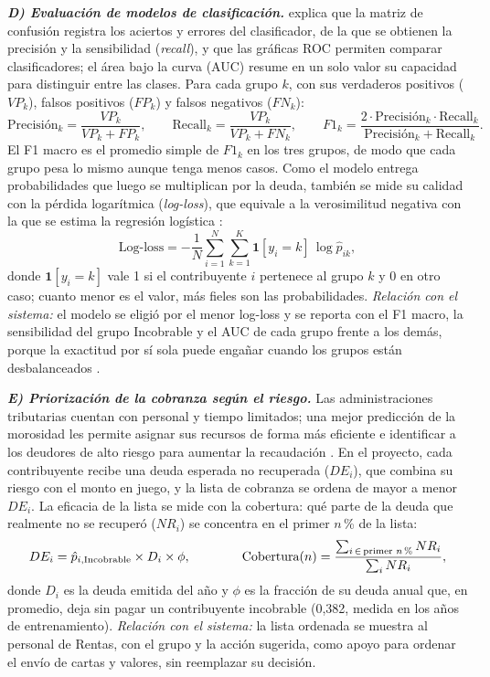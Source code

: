 \documentclass[12pt,a4paper]{report}
\begin{document}
\noindent\textbf{\textit{D) Evaluación de modelos de clasificación.}} \textcite{fawcett2006} explica que la matriz de confusión registra los aciertos y errores del clasificador, de la que se obtienen la precisión y la sensibilidad (\textit{recall}), y que las gráficas ROC permiten comparar clasificadores; el área bajo la curva (AUC) resume en un solo valor su capacidad para distinguir entre las clases. Para cada grupo $k$, con sus verdaderos positivos ($VP_k$), falsos positivos ($FP_k$) y falsos negativos ($FN_k$):
\begin{equation}
\text{Precisión}_k=\frac{VP_k}{VP_k+FP_k},\qquad
\text{Recall}_k=\frac{VP_k}{VP_k+FN_k},\qquad
F1_k=\frac{2\cdot\text{Precisión}_k\cdot\text{Recall}_k}{\text{Precisión}_k+\text{Recall}_k}.
\label{eq:metricas}
\end{equation}
El F1 macro es el promedio simple de $F1_k$ en los tres grupos, de modo que cada grupo pesa lo mismo aunque tenga menos casos. Como el modelo entrega probabilidades que luego se multiplican por la deuda, también se mide su calidad con la pérdida logarítmica (\textit{log-loss}), que equivale a la verosimilitud negativa con la que se estima la regresión logística \parencite{hosmer2013}:
\begin{equation}
\text{Log-loss}=-\frac{1}{N}\sum_{i=1}^{N}\sum_{k=1}^{K}\mathbf{1}[y_i=k]\,\log\hat{p}_{ik},
\label{eq:logloss}
\end{equation}
donde $\mathbf{1}[y_i=k]$ vale 1 si el contribuyente $i$ pertenece al grupo $k$ y 0 en otro caso; cuanto menor es el valor, más fieles son las probabilidades. \textit{Relación con el sistema:} el modelo se eligió por el menor log-loss y se reporta con el F1 macro, la sensibilidad del grupo Incobrable y el AUC de cada grupo frente a los demás, porque la exactitud por sí sola puede engañar cuando los grupos están desbalanceados \parencite{encalada2025}.

\noindent\textbf{\textit{E) Priorización de la cobranza según el riesgo.}} Las administraciones tributarias cuentan con personal y tiempo limitados; una mejor predicción de la morosidad les permite asignar sus recursos de forma más eficiente \parencite{leekim2024} e identificar a los deudores de alto riesgo para aumentar la recaudación \parencite{ourdani2024}. En el proyecto, cada contribuyente recibe una deuda esperada no recuperada ($DE_i$), que combina su riesgo con el monto en juego, y la lista de cobranza se ordena de mayor a menor $DE_i$. La eficacia de la lista se mide con la cobertura: qué parte de la deuda que realmente no se recuperó ($NR_i$) se concentra en el primer $n$\,\% de la lista:
\begin{equation}
DE_i=\hat{p}_{i,\text{Incobrable}}\times D_i\times\phi,\qquad\qquad
\text{Cobertura}(n)=\frac{\sum_{i\,\in\,\text{primer } n\text{\,\%}}NR_i}{\sum_{i}NR_i},
\label{eq:priorizacion}
\end{equation}
donde $D_i$ es la deuda emitida del año y $\phi$ es la fracción de su deuda anual que, en promedio, deja sin pagar un contribuyente incobrable (0,382, medida en los años de entrenamiento). \textit{Relación con el sistema:} la lista ordenada se muestra al personal de Rentas, con el grupo y la acción sugerida, como apoyo para ordenar el envío de cartas y valores, sin reemplazar su decisión.
\end{document}

